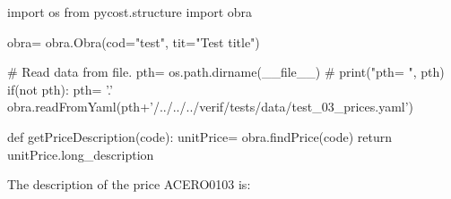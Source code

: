 \documentclass[11pt]{article}%
\begin{document}
 
 
 
\begin{pycode} 
 
import os
from pycost.structure import obra

obra= obra.Obra(cod="test", tit="Test title")

# Read data from file.
pth= os.path.dirname(__file__)
# print("pth= ", pth)
if(not pth):
    pth= '.'
obra.readFromYaml(pth+'/../../../verif/tests/data/test_03_prices.yaml')

def getPriceDescription(code):
    unitPrice= obra.findPrice(code)
    return unitPrice.long_description

\end{pycode} 
 
The description of the price ACERO0103 is:  
\end{document}
